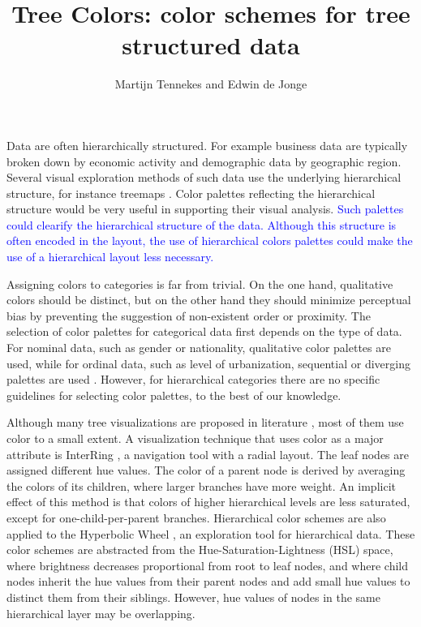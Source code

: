 \documentclass[review,journal]{vgtc}         %
\title{Tree Colors: color schemes for tree structured data}
\author{Martijn Tennekes and Edwin de Jonge}
\newcommand{\changedM}[1]{\textcolor{blue}{#1}}
\begin{document}
\lstset{language=R}

\label{secintro}

\maketitle
Data are often hierarchically structured. For example business data are typically broken down by economic activity and demographic data by geographic region. Several visual exploration methods of such data use the underlying hierarchical structure, for instance treemaps
\cite{shneiderman1992,tennekes2011b}. Color palettes reflecting the hierarchical structure would be very useful in supporting their visual analysis. \changedM{Such palettes could clearify the hierarchical structure of the data. Although this structure is often encoded in the layout, the use of hierarchical colors palettes could make the use of a hierarchical layout less necessary.}

Assigning colors to categories is far from trivial. On the one hand, qualitative colors should be distinct, but on the other hand they should minimize perceptual bias by preventing the suggestion of non-existent order or proximity. The selection of color palettes for categorical data first depends on the type of data. For nominal data, such as gender or nationality, qualitative color palettes are used, while for ordinal data, such as level of urbanization, sequential or diverging palettes are used \cite{brewer03, zeileis2009}. However, for hierarchical categories there are no specific guidelines for selecting color palettes, to the best of our knowledge.

Although many tree visualizations are proposed in literature \cite{schulz2011}, most of them use color to a small extent. A visualization technique that uses color as a major attribute is InterRing \cite{yang2002}, a navigation tool with a radial layout. The leaf nodes are assigned different hue values. The color of a parent node is derived by averaging the colors of its children, where larger branches have more weight. An implicit effect of this method is that colors of higher hierarchical levels are less saturated, except for one-child-per-parent branches. Hierarchical color schemes are also applied to the Hyperbolic Wheel \cite{lam2012}, an exploration tool for hierarchical data.  These color schemes are abstracted from the Hue-Saturation-Lightness (HSL) space, where brightness decreases proportional from root to leaf nodes, and where child nodes inherit the hue values from their parent nodes and add small hue values to distinct them from their siblings. However, hue values of nodes in the same hierarchical layer may be overlapping.
\end{document}
